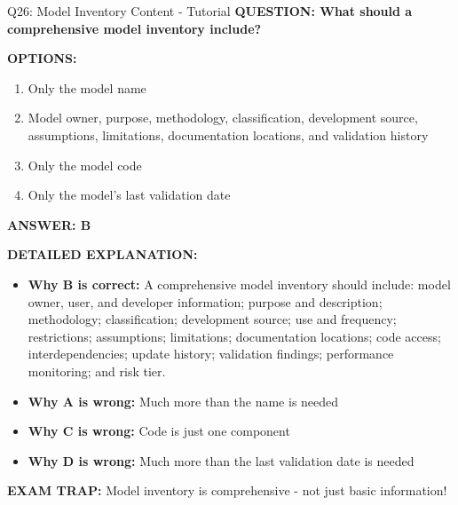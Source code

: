 \documentclass[8pt]{beamer}
\begin{document}
	\begin{frame}{Q26: Model Inventory Content - Tutorial}
		\fontsize{6.5}{7.5}\selectfont
		\textbf{QUESTION: What should a comprehensive model inventory include?}
		
		\vspace{0.1cm}
		\textbf{OPTIONS:}
		\begin{enumerate}
			\item Only the model name
			\item Model owner, purpose, methodology, classification, development source, assumptions, limitations, documentation locations, and validation history
			\item Only the model code
			\item Only the model's last validation date
		\end{enumerate}
		
		\vspace{0.1cm}
		\textcolor{myblue}{\textbf{ANSWER: B}}
		
		\vspace{0.1cm}
		\textbf{DETAILED EXPLANATION:}
		\begin{itemize}
			\item \textbf{Why B is correct:} A comprehensive model inventory should include: model owner, user, and developer information; purpose and description; methodology; classification; development source; use and frequency; restrictions; assumptions; limitations; documentation locations; code access; interdependencies; update history; validation findings; performance monitoring; and risk tier.
			\item \textbf{Why A is wrong:} Much more than the name is needed
			\item \textbf{Why C is wrong:} Code is just one component
			\item \textbf{Why D is wrong:} Much more than the last validation date is needed
		\end{itemize}
		
		\textcolor{myred}{\textbf{EXAM TRAP:}} Model inventory is \textcolor{myblue}{comprehensive} - not just basic information!
	\end{frame}
	
\end{document}
